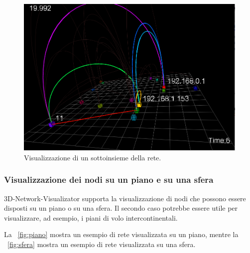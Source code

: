 \documentclass[a4paper,12pt]{article}
\begin{document}

\begin{figure}[htb!]
 \begin{center}
  \includegraphics[width=\textwidth]{images/image3.png}
 \end{center}
 \caption{Visualizzazione di un sottoinsieme della rete.}
 \label{fig:sottoinsieme}
\end{figure}
 
 
\subsubsection{Visualizzazione dei nodi su un piano e su una sfera}
3D-Network-Visualizator supporta la visualizzazione di nodi che possono essere disposti su un piano o su una sfera. Il secondo caso potrebbe essere utile per visualizzare, ad esempio, i piani di volo intercontinentali.

La \figurename~\ref{fig:piano} mostra un esempio di rete visualizzata su un piano, mentre la \figurename~\ref{fig:sfera} mostra un esempio di rete visualizzata su una sfera.
\end{document}
